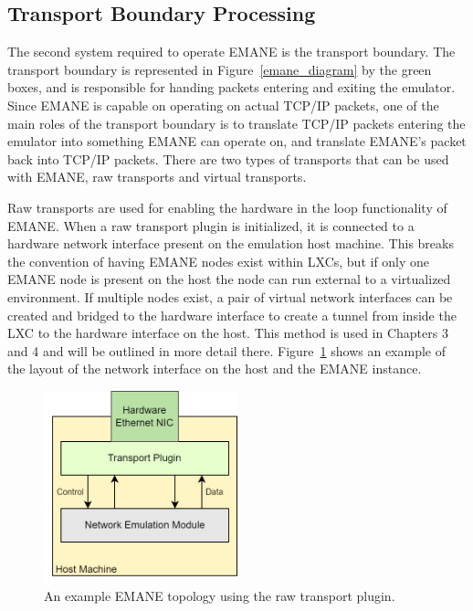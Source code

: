 \subsection{Transport Boundary Processing}
The second system required to operate EMANE is the transport boundary.
The transport boundary is represented in Figure~\ref{emane_diagram} by the green boxes, and is responsible for handing packets entering and exiting the emulator.
Since EMANE is capable on operating on actual TCP/IP packets, one of the main roles of the transport boundary is to translate TCP/IP packets entering the emulator into something EMANE can operate on, and translate EMANE's packet back into TCP/IP packets.
There are two types of transports that can be used with EMANE, raw transports and virtual transports.\par
Raw transports are used for enabling the hardware in the loop functionality of EMANE.
When a raw transport plugin is initialized, it is connected to a hardware network interface present on the emulation host machine.
This breaks the convention of having EMANE nodes exist within LXCs, but if only one EMANE node is present on the host the node can run external to a virtualized environment.
If multiple nodes exist, a pair of virtual network interfaces can be created and bridged to the hardware interface to create a tunnel from inside the LXC to the hardware interface on the host.
This method is used in Chapters 3 and 4 and will be outlined in more detail there.
Figure~\ref{emane_raw_transport} shows an example of the layout of the network interface on the host and the EMANE instance.

\begin{figure}[!ht]
    \centering
    \includegraphics[width=0.5\textwidth,keepaspectratio]{Images/Chpt2/RawTransport.png}
    \caption{An example EMANE topology using the raw transport plugin.}
    \label{emane_raw_transport}
\end{figure}

